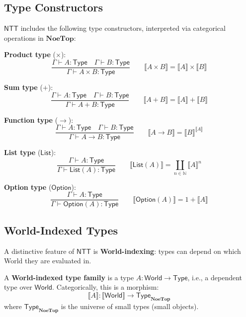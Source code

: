 \subsection{Type Constructors}
\label{subsec:type-constructors}

\begin{definition}
\label{def:simple-type-constructors}
$\mathsf{NTT}$ includes the following type constructors, interpreted via
categorical operations in $\mathbf{NoeTop}$:

\textbf{Product type} ($\times$):
\[
  \frac{\Gamma \vdash A : \mathsf{Type} \quad \Gamma \vdash B : \mathsf{Type}}
       {\Gamma \vdash A \times B : \mathsf{Type}}
  \qquad
  \llbracket A \times B \rrbracket = \llbracket A \rrbracket \times \llbracket B \rrbracket
\]

\textbf{Sum type} ($+$):
\[
  \frac{\Gamma \vdash A : \mathsf{Type} \quad \Gamma \vdash B : \mathsf{Type}}
       {\Gamma \vdash A + B : \mathsf{Type}}
  \qquad
  \llbracket A + B \rrbracket = \llbracket A \rrbracket + \llbracket B \rrbracket
\]

\textbf{Function type} ($\to$):
\[
  \frac{\Gamma \vdash A : \mathsf{Type} \quad \Gamma \vdash B : \mathsf{Type}}
       {\Gamma \vdash A \to B : \mathsf{Type}}
  \qquad
  \llbracket A \to B \rrbracket = \llbracket B \rrbracket^{\llbracket A \rrbracket}
\]

\textbf{List type} ($\mathsf{List}$):
\[
  \frac{\Gamma \vdash A : \mathsf{Type}}
       {\Gamma \vdash \mathsf{List}(A) : \mathsf{Type}}
  \qquad
  \llbracket \mathsf{List}(A) \rrbracket = \coprod_{n \in \mathbb{N}} \llbracket A \rrbracket^n
\]

\textbf{Option type} ($\mathsf{Option}$):
\[
  \frac{\Gamma \vdash A : \mathsf{Type}}
       {\Gamma \vdash \mathsf{Option}(A) : \mathsf{Type}}
  \qquad
  \llbracket \mathsf{Option}(A) \rrbracket = 1 + \llbracket A \rrbracket
\]
\end{definition}

\subsection{World-Indexed Types}
\label{subsec:world-indexed-types}

A distinctive feature of $\mathsf{NTT}$ is \textbf{World-indexing}: types can
depend on which World they are evaluated in.

\begin{definition}
\label{def:world-indexed-type}
A \textbf{World-indexed type family} is a type $A : \mathsf{World} \to \mathsf{Type}$,
i.e., a dependent type over $\mathsf{World}$. Categorically, this is a morphism:
\[
  \llbracket A \rrbracket : \llbracket \mathsf{World} \rrbracket \to \mathsf{Type}_{\mathbf{NoeTop}}
\]
where $\mathsf{Type}_{\mathbf{NoeTop}}$ is the universe of small types (small objects).
\end{definition}

